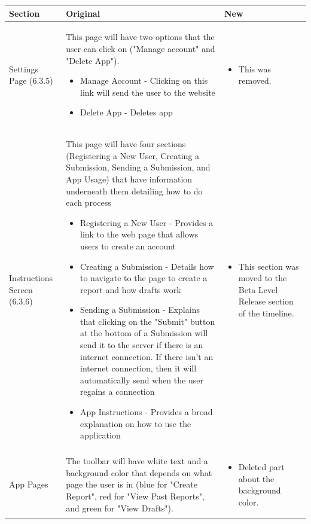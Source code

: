 \documentclass[onecolumn, draftclsnofoot, article, 10pt, compsoc]{IEEEtran}
\begin{document}
\begin{table}
\begin{tabularx}{\textwidth}{|>{\setlength\hsize{.8\hsize}\setlength\linewidth{\hsize}}X|>{\setlength\hsize{1.1\hsize}\setlength\linewidth{\hsize}}X|>{\setlength\hsize{1.1\hsize}\setlength\linewidth{\hsize}}X|}
\hline
Section & Original & New \\

\hline
Settings Page (6.3.5) 
&
This page will have two options that the user can click on ("Manage account" and "Delete App").
\begin{itemize}
\item Manage Account - Clicking on this link will send the user to the website
\item Delete App - Deletes app 
\end{itemize}
&
\begin{itemize}
    \item This was removed.
\end{itemize}
 \\

\hline
Instructions Screen (6.3.6)
&
This page will have four sections (Registering a New User, Creating a Submission, Sending a Submission, and App Usage) that have information underneath them detailing how to do each process
\begin{itemize}

\item Registering a New User - Provides a link to the web page that allows users to create an account
\item Creating a Submission - Details how to navigate to the page to create a report and how drafts work 
\item Sending a Submission - Explains that clicking on the "Submit" button at the bottom of a Submission will send it to the server if there is an internet connection. If there isn't an internet connection, then it will automatically send when the user regains a connection 
\item App Instructions - Provides a broad explanation on how to use the application
\end{itemize}
&
\begin{itemize}
    \item This section was moved to the Beta Level Release section of the timeline.
\end{itemize}
 \\
\hline

App Pages
&
The toolbar will have white text and a background color that depends on what page the user is in (blue for "Create Report", red for "View Past Reports", and green for "View Drafts").
&
\begin{itemize}
    \item Deleted part about the background color.
\end{itemize}
 \\

\hline


\end{tabularx}
\end{table}
\end{document}
